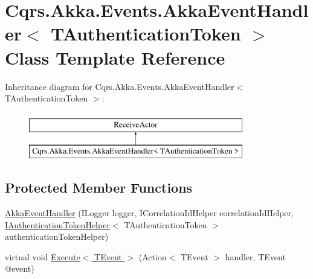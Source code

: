 \hypertarget{classCqrs_1_1Akka_1_1Events_1_1AkkaEventHandler}{}\section{Cqrs.\+Akka.\+Events.\+Akka\+Event\+Handler$<$ T\+Authentication\+Token $>$ Class Template Reference}
\label{classCqrs_1_1Akka_1_1Events_1_1AkkaEventHandler}
Inheritance diagram for Cqrs.\+Akka.\+Events.\+Akka\+Event\+Handler$<$ T\+Authentication\+Token $>$\+:\begin{figure}[H]
\begin{center}
\leavevmode
\includegraphics[height=2.000000cm]{classCqrs_1_1Akka_1_1Events_1_1AkkaEventHandler}
\end{center}
\end{figure}
\subsection*{Protected Member Functions}
\begin{DoxyCompactItemize}
\item 
\hyperlink{classCqrs_1_1Akka_1_1Events_1_1AkkaEventHandler_aee50c0ed50e291f311721ca6a103c41f_aee50c0ed50e291f311721ca6a103c41f}{Akka\+Event\+Handler} (I\+Logger logger, I\+Correlation\+Id\+Helper correlation\+Id\+Helper, \hyperlink{interfaceCqrs_1_1Authentication_1_1IAuthenticationTokenHelper}{I\+Authentication\+Token\+Helper}$<$ T\+Authentication\+Token $>$ authentication\+Token\+Helper)
\item 
virtual void \hyperlink{classCqrs_1_1Akka_1_1Events_1_1AkkaEventHandler_af277504938e0513e05f3a8784ece2af2_af277504938e0513e05f3a8784ece2af2}{Execute$<$ T\+Event $>$} (Action$<$ T\+Event $>$ handler, T\+Event @event)
\end{DoxyCompactItemize}
